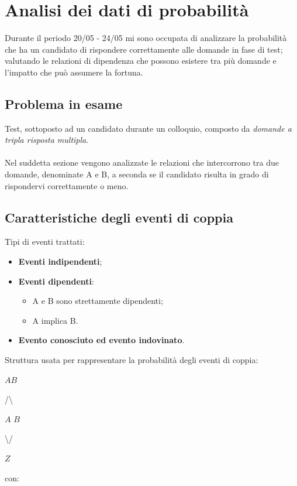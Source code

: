 
\section{Analisi dei dati di probabilit\`a}
\label{Analisi dei dati}

Durante il periodo 20/05 - 24/05 mi sono occupata di analizzare la probabilit\`a che ha un candidato di rispondere correttamente alle domande in fase di test; valutando le relazioni di dipendenza che possono esistere tra pi\`u domande e l'impatto che pu\`o assumere la fortuna.

\subsection{Problema in esame}
\label{Problema in esame}

Test, sottoposto ad un candidato  durante un colloquio, composto da \textit{domande a tripla risposta multipla}.\\\\ Nel suddetta sezione vengono analizzate le relazioni che intercorrono tra due domande, denominate A e B, a seconda se il candidato risulta in grado di rispondervi correttamente o meno.

\subsection{Caratteristiche degli eventi di coppia}
\label{Caratteristiche degli eventi di coppia}

Tipi di eventi trattati:
\begin{itemize}
\item \textbf{Eventi indipendenti};
\item \textbf{Eventi dipendenti}:
  \begin{itemize}
  \item A e B sono strettamente dipendenti;
  \item A implica B.
  \end{itemize}
\item \textbf{Evento conosciuto ed evento indovinato}.
\end{itemize}
\noindent
Struttura usata per rappresentare la probabilit\`a degli eventi di coppia:

\begin{center}$AB$\end{center}
\begin{center} /\textbackslash \end{center}
\begin{center}$A$   $B$ \end{center}
\begin{center} \textbackslash / \end{center}
\begin{center}$Z$\end{center}
con:

